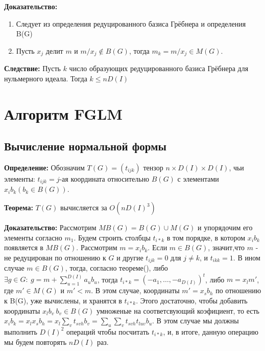 \documentclass{article}
\begin{document}
    \textbf{Доказательство:}
    \begin{enumerate}
        \item Следует из определения редуцированного базиса Грёбнера и определения B(G)
        \item Пусть $x_j$ делит $m$ и $m/x_j \notin B(G)$, тогда $m_k = m/x_j \in M(G)$. 
    \end{enumerate}

    \textbf{Следствие:} Пусть $k$ число образующих редуцированного базиса Грёбнера для нульмерного идеала.
        Тогда $k \leq nD(I)$
    
    \newpage    

\section{Алгоритм FGLM}

    \subsection{Вычисление нормальной формы}
    \textbf{Определение:}  Обозначим $T(G) = (t_{ijk})$ тензор $n \times D(I) \times D(I)$, чьи элементы:
            $t_{ijk}=j$-ая координата относительно $B(G)$ с элементами $x_ib_k (b_k \in B(G))$.

    \textbf{Теорема:} $T(G)$ вычисляется за $O(nD(I)^3)$

    \textbf{Доказательство:} Рассмотрим $MB(G) = B(G) \cup M(G)$ и упорядочим его элементы согласно $m_1$. Будем строить столбцы
    $t_{i*k}$ в том порядке, в котором $x_ib_k$ появляется в $MB(G)$. Рассмотрим $m=x_ib_k$. Если $m \in B(G)$, значит,что $m$ - не 
    редуцирован по отношению к $G$ и другие $t_{ijk} = 0$ для $j \neq k$, и $t_{ikk}=1$. В ином случае $m \in B(G)$, тогда, согласно теореме(), 
    либо $\exists g \in G:\: g=m+\sum_{u=1}^{D(I)} a_ub_u$, тогда $t_{i*k}=(-a_1,\ldots, -a_{D(I)})^t$, либо
    $m=x_lm'$, где $m'\in M(G)$ и $m'<m$. В этом случае, координаты $m'=x_sb_h$ по отношению к B(G), уже вычислены, и хранятся в $t_{i*k}$. 
    Этого достаточно, чтобы добавить координаты $x_lb_v \: b_v \in B(G)$ умноженые на соответсвующий коэфициент, то есть
    $x_ib_k = x_lx_sb_h = x_l\sum_{v} {t_{svh}b_v}=\sum_u\sum_v{t_{svh}t_{luv}b_u}$. В этом случае мы должны выполнить $D(I)^2$ операций
    чтобы посчитать $t_{i*k}$, и, в итоге, данную операцию мы будем повторять $nD(I)$ раз.
\end{document}
